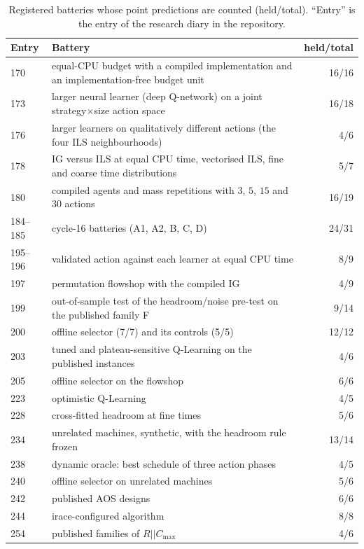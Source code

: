 \begin{table}[t]
\caption{Registered batteries whose point predictions are counted (held/total). ``Entry'' is the entry of the research diary in the repository.}
\label{tab:batteries}
\centering
{\scriptsize\setlength{\tabcolsep}{4pt}
\begin{tabular}{@{}lp{}r@{}}
\toprule
Entry & Battery & held/total \\
\midrule
170 & equal-CPU budget with a compiled implementation and an implementation-free budget unit & 16/16 \\
173 & larger neural learner (deep Q-network) on a joint strategy$\times$size action space & 16/18 \\
176 & larger learners on qualitatively different actions (the four ILS neighbourhoods) & 4/6 \\
178 & IG versus ILS at equal CPU time, vectorised ILS, fine and coarse time distributions & 5/7 \\
180 & compiled agents and mass repetitions with $3$, $5$, $15$ and $30$ actions & 16/19 \\
184--185 & cycle-16 batteries (A1, A2, B, C, D) & 24/31 \\
195--196 & validated action against each learner at equal CPU time & 8/9 \\
197 & permutation flowshop with the compiled IG & 4/9 \\
199 & out-of-sample test of the headroom/noise pre-test on the published family F & 9/14 \\
200 & offline selector (7/7) and its controls (5/5) & 12/12 \\
203 & tuned and plateau-sensitive Q-Learning on the published instances & 4/6 \\
205 & offline selector on the flowshop & 6/6 \\
223 & optimistic Q-Learning & 4/5 \\
228 & cross-fitted headroom at fine times & 5/6 \\
234 & unrelated machines, synthetic, with the headroom rule frozen & 13/14 \\
238 & dynamic oracle: best schedule of three action phases & 4/5 \\
240 & offline selector on unrelated machines & 5/6 \\
242 & published AOS designs & 6/6 \\
244 & irace-configured algorithm & 8/8 \\
254 & published families of $R||C_{\max}$ & 4/6 \\

\end{tabular}}
\end{table}
